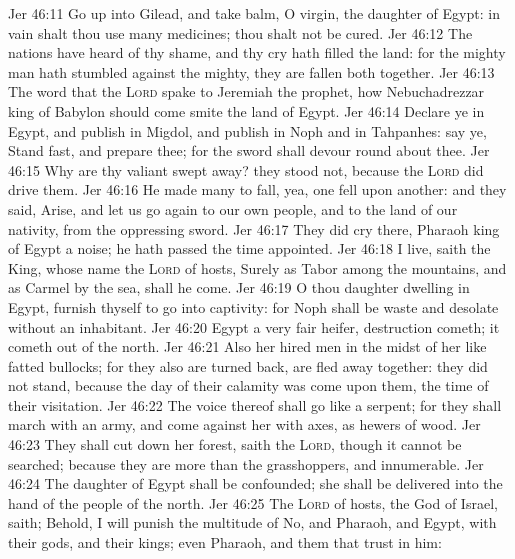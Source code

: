 \vs Jer 46:11 Go up into Gilead, and take balm, O virgin, the daughter of Egypt: in vain shalt thou use many medicines;  thou shalt not be cured.
\vs Jer 46:12 The nations have heard of thy shame, and thy cry hath filled the land: for the mighty man hath stumbled against the mighty,  they are fallen both together.
\vs Jer 46:13 The word that the \textsc{Lord} spake to Jeremiah the prophet, how Nebuchadrezzar king of Babylon should come  smite the land of Egypt.
\vs Jer 46:14 Declare ye in Egypt, and publish in Migdol, and publish in Noph and in Tahpanhes: say ye, Stand fast, and prepare thee; for the sword shall devour round about thee.
\vs Jer 46:15 Why are thy valiant  swept away? they stood not, because the \textsc{Lord} did drive them.
\vs Jer 46:16 He made many to fall, yea, one fell upon another: and they said, Arise, and let us go again to our own people, and to the land of our nativity, from the oppressing sword.
\vs Jer 46:17 They did cry there, Pharaoh king of Egypt  a noise; he hath passed the time appointed.
\vs Jer 46:18  I live, saith the King, whose name  the \textsc{Lord} of hosts, Surely as Tabor  among the mountains, and as Carmel by the sea,  shall he come.
\vs Jer 46:19 O thou daughter dwelling in Egypt, furnish thyself to go into captivity: for Noph shall be waste and desolate without an inhabitant.
\vs Jer 46:20 Egypt  a very fair heifer,  destruction cometh; it cometh out of the north.
\vs Jer 46:21 Also her hired men  in the midst of her like fatted bullocks; for they also are turned back,  are fled away together: they did not stand, because the day of their calamity was come upon them,  the time of their visitation.
\vs Jer 46:22 The voice thereof shall go like a serpent; for they shall march with an army, and come against her with axes, as hewers of wood.
\vs Jer 46:23 They shall cut down her forest, saith the \textsc{Lord}, though it cannot be searched; because they are more than the grasshoppers, and  innumerable.
\vs Jer 46:24 The daughter of Egypt shall be confounded; she shall be delivered into the hand of the people of the north.
\vs Jer 46:25 The \textsc{Lord} of hosts, the God of Israel, saith; Behold, I will punish the multitude of No, and Pharaoh, and Egypt, with their gods, and their kings; even Pharaoh, and  them that trust in him:
